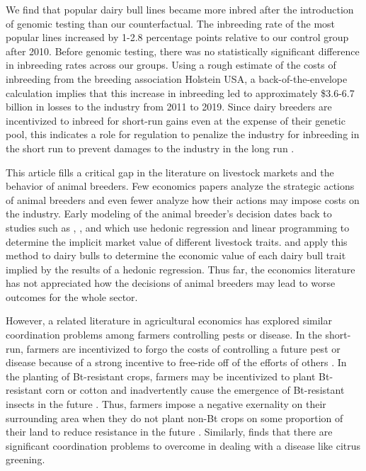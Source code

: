 \documentclass[12pt,letterpaper]{article}
\begin{document}
We find that popular dairy bull lines became more inbred after the introduction of genomic testing than our counterfactual.
The inbreeding rate of the most popular lines increased by 1-2.8 percentage points relative to our control group after 2010.
Before genomic testing, there was no statistically significant difference in inbreeding rates across our groups.
Using a rough estimate of the costs of inbreeding from the breeding association Holstein USA, a back-of-the-envelope calculation implies that this increase in inbreeding led to approximately \$3.6-6.7 billion in losses to the industry from 2011 to 2019.
Since dairy breeders are incentivized to inbreed for short-run gains even at the expense of their genetic pool, this indicates a role for regulation to penalize the industry for inbreeding in the short run to prevent damages to the industry in the long run \citep{Cole2023}.

This article fills a critical gap in the literature on livestock markets and the behavior of animal breeders.
Few economics papers analyze the strategic actions of animal breeders and even fewer analyze how their actions may impose costs on the industry.
Early modeling of the animal breeder's decision dates back to studies such as \citet{ladd1978}, \citet{Kerr1984}, and \citet{Melton1994} which use hedonic regression and linear programming to determine the implicit market value of different livestock traits.
\citet{Richards1996} and \citet{Schroeder1992} apply this method to dairy bulls to determine the economic value of each dairy bull trait implied by the results of a hedonic regression.
Thus far, the economics literature has not appreciated how the decisions of animal breeders may lead to worse outcomes for the whole sector.

However, a related literature in agricultural economics has explored similar coordination problems among farmers controlling pests or disease.
In the short-run, farmers are incentivized to forgo the costs of controlling a future pest or disease because of a strong incentive to free-ride off of the efforts of others \citep{epanchin2015individual}.
In the planting of Bt-resistant crops, farmers may be incentivized to plant Bt-resistant corn or cotton and inadvertently cause the emergence of Bt-resistant insects in the future \citep{brown2018voluntary,wechsler2018has,livingston2004managing}.
Thus, farmers impose a negative exernality on their surrounding area when they do not plant non-Bt crops on some proportion of their land to reduce resistance in the future \citep{brown2018voluntary,hurley2001bt,huang2011success,desquilbet2016dynamics}.
Similarly, \citet{lence2023does} finds that there are significant coordination problems to overcome in dealing with a disease like citrus greening.
\end{document}
